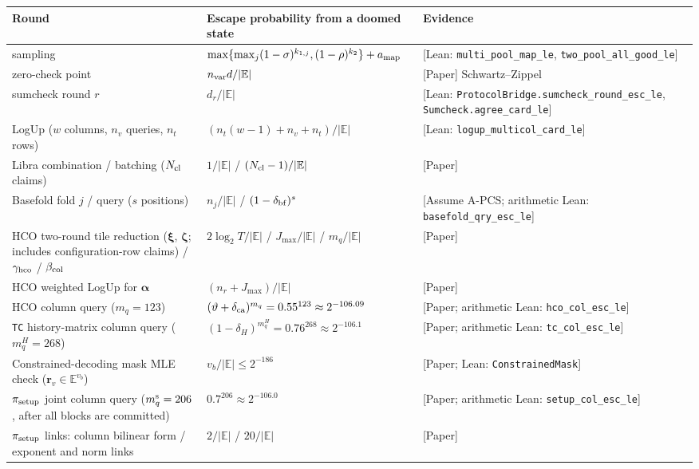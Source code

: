 \documentclass[10pt]{article}
\begin{document}
\begin{center}\small
\begin{tabularx}{\linewidth}{YYY}
\toprule
{}\textbf{Round} & {}\textbf{Escape probability from a doomed state} & {}\textbf{Evidence} \\
\midrule
{}sampling & {}$\max\{\max_j(1-\sigma)^{k_{1,j}},(1-\rho)^{k_2}\}+a_{\rm map}$ & {}[Lean: \texttt{multi\_\allowbreak{}pool\_\allowbreak{}map\_\allowbreak{}le}, \texttt{two\_\allowbreak{}pool\_\allowbreak{}all\_\allowbreak{}good\_\allowbreak{}le}] \\
{}zero-check point & {}$n_{\rm var}d/\lvert\mathbb E\rvert$ & {}[Paper] Schwartz--Zippel \\
{}sumcheck round $r$ & {}$d_r/\lvert\mathbb E\rvert$ & {}[Lean: \texttt{ProtocolBridge.\allowbreak{}sumcheck\_\allowbreak{}round\_\allowbreak{}esc\_\allowbreak{}le}, \texttt{Sumcheck.\allowbreak{}agree\_\allowbreak{}card\_\allowbreak{}le}] \\
{}LogUp ($w$ columns, $n_v$ queries, $n_t$ rows) & {}$(n_t(w-1)+n_v+n_t)/\lvert\mathbb E\rvert$ & {}[Lean: \texttt{logup\_\allowbreak{}multicol\_\allowbreak{}card\_\allowbreak{}le}] \\
{}Libra combination / batching ($N_{\rm cl}$ claims) & {}$1/\lvert\mathbb E\rvert$ / $(N_{\rm cl}-1)/\lvert\mathbb E\rvert$ & {}[Paper] \\
{}Basefold fold $j$ / query ($s$ positions) & {}$n_j/\lvert\mathbb E\rvert$ / $(1-\delta_{\rm bf})^s$ & {}[Assume A-PCS; arithmetic Lean: \texttt{basefold\_\allowbreak{}qry\_\allowbreak{}esc\_\allowbreak{}le}] \\
{}HCO two-round tile reduction ($\boldsymbol\xi$, $\boldsymbol\zeta$; includes configuration-row claims) / $\gamma_{\rm hco}$ / $\beta_{\rm col}$ & {}$2\log_2T/\lvert\mathbb E\rvert$ / $J_{\max}/\lvert\mathbb E\rvert$ / $m_q/\lvert\mathbb E\rvert$ & {}[Paper] \\
{}HCO weighted LogUp for $\boldsymbol\alpha$ & {}$(n_r+J_{\max})/\lvert\mathbb E\rvert$ & {}[Paper] \\
{}HCO column query ($m_q=123$) & {}$(\vartheta+\delta_{\rm ca})^{m_q}=0.55^{123}\approx2^{-106.09}$ & {}[Paper; arithmetic Lean: \texttt{hco\_\allowbreak{}col\_\allowbreak{}esc\_\allowbreak{}le}] \\
{}\texttt{TC} history-matrix column query ($m_q^H=268$) & {}$(1-\delta_H)^{m_q^H}=0.76^{268}\approx2^{-106.1}$ & {}[Paper; arithmetic Lean: \texttt{tc\_\allowbreak{}col\_\allowbreak{}esc\_\allowbreak{}le}] \\
{}Constrained-decoding mask MLE check ($\mathbf r_v\in\mathbb E^{v_b}$) & {}$v_b/\lvert\mathbb E\rvert\le 2^{-186}$ & {}[Paper; Lean: \texttt{ConstrainedMask}] \\
{}$\pi_{\rm setup}$ joint column query ($m^{\rm s}_q=206$, after all blocks are committed) & {}$0.7^{206}\approx2^{-106.0}$ & {}[Paper; arithmetic Lean: \texttt{setup\_\allowbreak{}col\_\allowbreak{}esc\_\allowbreak{}le}] \\
{}$\pi_{\rm setup}$ links: column bilinear form / exponent and norm links & {}$2/\lvert\mathbb E\rvert$ / $20/\lvert\mathbb E\rvert$ & {}[Paper] \\
\bottomrule
\end{tabularx}
\end{center}
\end{document}
